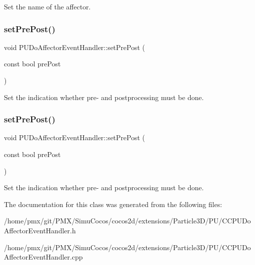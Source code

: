 Set the name of the affector. \mbox{\label{classPUDoAffectorEventHandler_ab0496c908b49a28cc80113a96b512f4e}} 
\subsubsection{\texorpdfstring{set\+Pre\+Post()}{setPrePost()}\hspace{0.1cm}{\footnotesize\ttfamily [1/2]}}
{\footnotesize\ttfamily void P\+U\+Do\+Affector\+Event\+Handler\+::set\+Pre\+Post (\begin{DoxyParamCaption}\item[{const bool}]{pre\+Post }\end{DoxyParamCaption})\hspace{0.3cm}{\ttfamily [inline]}}

Set the indication whether pre-\/ and postprocessing must be done. \mbox{\label{classPUDoAffectorEventHandler_ab0496c908b49a28cc80113a96b512f4e}} 
\subsubsection{\texorpdfstring{set\+Pre\+Post()}{setPrePost()}\hspace{0.1cm}{\footnotesize\ttfamily [2/2]}}
{\footnotesize\ttfamily void P\+U\+Do\+Affector\+Event\+Handler\+::set\+Pre\+Post (\begin{DoxyParamCaption}\item[{const bool}]{pre\+Post }\end{DoxyParamCaption})\hspace{0.3cm}{\ttfamily [inline]}}

Set the indication whether pre-\/ and postprocessing must be done. 

The documentation for this class was generated from the following files\+:\begin{DoxyCompactItemize}
\item 
/home/pmx/git/\+P\+M\+X/\+Simu\+Cocos/cocos2d/extensions/\+Particle3\+D/\+P\+U/C\+C\+P\+U\+Do\+Affector\+Event\+Handler.\+h\item 
/home/pmx/git/\+P\+M\+X/\+Simu\+Cocos/cocos2d/extensions/\+Particle3\+D/\+P\+U/C\+C\+P\+U\+Do\+Affector\+Event\+Handler.\+cpp\end{DoxyCompactItemize}
